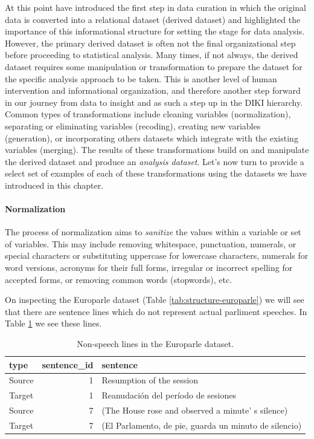 \documentclass[
]{article}
\begin{document}
At this point have introduced the first step in data curation in which the original data is converted into a relational dataset (derived dataset) and highlighted the importance of this informational structure for setting the stage for data analysis. However, the primary derived dataset is often not the final organizational step before proceeding to statistical analysis. Many times, if not always, the derived dataset requires some manipulation or transformation to prepare the dataset for the specific analysis approach to be taken. This is another level of human intervention and informational organization, and therefore another step forward in our journey from data to insight and as such a step up in the DIKI hierarchy. Common types of transformations include cleaning variables (normalization), separating or eliminating variables (recoding), creating new variables (generation), or incorporating others datasets which integrate with the existing variables (merging). The results of these transformations build on and manipulate the derived dataset and produce an \emph{analysis dataset}. Let's now turn to provide a select set of examples of each of these transformations using the datasets we have introduced in this chapter.

\hypertarget{normalization}{%
\paragraph{Normalization}\label{normalization}}

The process of normalization aims to \emph{sanitize} the values within a variable or set of variables. This may include removing whitespace, punctuation, numerals, or special characters or substituting uppercase for lowercase characters, numerals for word versions, acronyms for their full forms, irregular or incorrect spelling for accepted forms, or removing common words (stopwords), etc.

On inspecting the Europarle dataset (Table \ref{tab:structure-europarle}) we will see that there are sentence lines which do not represent actual parliment speeches. In Table \ref{tab:normalize-non-speech-identify-europarle} we see these lines.

\begin{table}

\caption{\label{tab:normalize-non-speech-identify-europarle}Non-speech lines in the Europarle dataset.}
\centering
\begin{tabular}[t]{lrl}
\toprule
type & sentence\_id & sentence\\
\midrule
Source & 1 & Resumption of the session\\
Target & 1 & Reanudación del período de sesiones\\
Source & 7 & (The House rose and observed a minute' s silence)\\
Target & 7 & (El Parlamento, de pie, guarda un minuto de silencio)\\
\bottomrule
\end{tabular}
\end{table}
\end{document}
